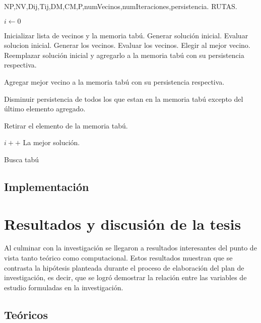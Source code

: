 \begin{algorithm}
\begin{algorithmic}[htbp]
\REQUIRE NP,NV,Dij,Tij,DM,CM,P,numVecinos,numIteraciones,persistencia.  %
 \label{lin:algoritmo_pseudocodigo}
\ENSURE RUTAS.                                                          %

\STATE $i \leftarrow 0 $

\STATE Inicializar lista de vecinos y la memoria tabú.
\STATE Generar solución inicial.
\STATE Evaluar solucion inicial.
\STATE Generar los vecinos.
\STATE Evaluar los vecinos.
\STATE Elegir al mejor vecino.
\STATE Reemplazar solución inicial y agregarlo a la memoria tabú con su persistencia respectiva.

\ELSE
\STATE Agregar mejor vecino a la memoria tabú con su persistencia respectiva.

\ENDIF
\STATE Disminuir persistencia de todos los que estan en la memoria tabú excepto del último elemento agregado.

\STATE Retirar el elemento de la memoria tabú.
\ENDIF

\STATE $i++$
\ENDWHILE
\RETURN  La mejor solución.


\end{algorithmic}
\caption{Busca tabú}
\label{alg:algoritmoBT}
\end{algorithm}


\section{Implementación} 



\chapter{Resultados y discusión de la tesis}


Al culminar con la investigación se llegaron a resultados interesantes del punto de vista tanto teórico como computacional. Estos resultados muestran que se contrasta la hipótesis planteada durante el proceso de elaboración del plan de investigación, es decir, que se logró demostrar la relación entre las variables de estudio formuladas en la investigación.

\section{Teóricos}

